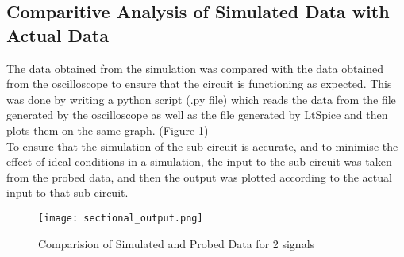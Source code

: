 \subsection{Comparitive Analysis of Simulated Data with Actual Data}
The data obtained from the simulation was compared with the data obtained from the oscilloscope to ensure that the circuit is functioning as expected.
\noindent
This was done by writing a python script (.py file) which reads the data from the file generated by the oscilloscope as well as the file generated by LtSpice and then plots them on the same graph. (Figure \ref{fig:sec_out})\\
\noindent
To ensure that the simulation of the sub-circuit is accurate, and to minimise the effect of ideal conditions in a simulation, the input to the sub-circuit was taken from the probed data, and then the output was plotted according to the actual input to that sub-circuit.\\
\begin{figure}[H]
    \centering
    \texttt{[image: sectional\_output.png]}
    \caption{Comparision of Simulated and Probed Data for 2 signals}
    \label{fig:sec_out}
\end{figure}